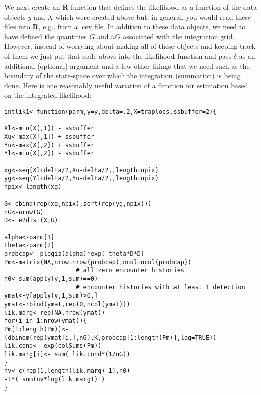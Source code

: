 We next create an {\bf R} function that defines the likelihood as a function
of the data objects $y$ and $X$ which were created above but, in general,
you would read these files into {\bf R}, e.g., from a .csv file.
In addition to these data
objects, we need to have defined the  quantities $G$ and $nG$ associated
with the integration grid.
However, instead of worrying about making all of these objects and
keeping track of them we just put that code above into the likelihood
function and pass $\delta$ as an additional (optional) argument and a
few other things that we need such as the boundary of the state-space
over which the integration (summation) is being done.
Here is one reasonably useful variation of a function for estimation
based on the integrated likelihood:

{\small 
\begin{verbatim}
intlik1<-function(parm,y=y,delta=.2,X=traplocs,ssbuffer=2){

Xl<-min(X[,1]) - ssbuffer 
Xu<-max(X[,1]) + ssbuffer
Yu<-max(X[,2]) + ssbuffer
Yl<-min(X[,2]) - ssbuffer

xg<-seq(Xl+delta/2,Xu-delta/2,,length=npix) 
yg<-seq(Yl+delta/2,Yu-delta/2,,length=npix) 
npix<-length(xg)

G<-cbind(rep(xg,npix),sort(rep(yg,npix)))
nG<-nrow(G)
D<- e2dist(X,G)  

alpha<-parm[1]
theta<-parm[2]
probcap<- plogis(alpha)*exp(-theta*D*D)
Pm<-matrix(NA,nrow=nrow(probcap),ncol=ncol(probcap))
                    # all zero encounter histories
n0<-sum(apply(y,1,sum)==0) 
                    # encounter histories with at least 1 detection
ymat<-y[apply(y,1,sum)>0,] 
ymat<-rbind(ymat,rep(0,ncol(ymat)))
lik.marg<-rep(NA,nrow(ymat))
for(i in 1:nrow(ymat)){
Pm[1:length(Pm)]<- (dbinom(rep(ymat[i,],nG),K,probcap[1:length(Pm)],log=TRUE))
lik.cond<- exp(colSums(Pm))
lik.marg[i]<- sum( lik.cond*(1/nG))  
}
nv<-c(rep(1,length(lik.marg)-1),n0)
-1*( sum(nv*log(lik.marg)) )
}
\end{verbatim}
}


